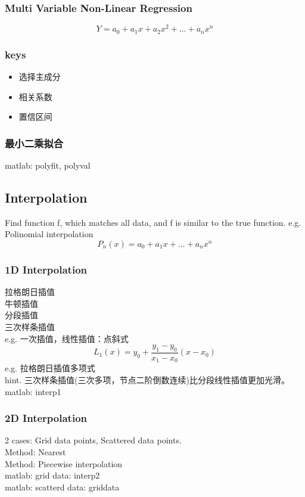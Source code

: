 \documentclass[12pt,a4paper]{article} \usepackage{kurier}
\begin{document}
\begin{CJK}{UTF8}{gkai}
\begin{multicols}{2}
		\subsubsection{Multi Variable Non-Linear Regression}
			\[ Y = a_0 + a_1 x + a_2 x^2 + \ldots + a_n x^n \]
		\subsubsection{keys}
			\begin{itemize}
			\item 选择主成分
			\item 相关系数
			\item 置信区间
			\end{itemize}
		\subsubsection{最小二乘拟合}
			matlab: polyfit, polyval\\
	\subsection{Interpolation}
		Find function f, which matches all data, and f is similar to the true function.
		e.g. Polinomial interpolation
		\[ P_n (x) = a_0 + a_1 x + \ldots + a_n x^n \]
		\subsubsection{1D Interpolation}
			拉格朗日插值\\ 牛顿插值\\ 分段插值\\ 三次样条插值\\
			e.g. 一次插值，线性插值：点斜式
			\[ L_1(x) = y_0 + \frac{y_1 - y_0}{x_1 - x_0} (x - x_0) \]
			e.g. 拉格朗日插值多项式\\
			hint. 三次样条插值(三次多项，节点二阶倒数连续)比分段线性插值更加光滑。\\
			matlab: interp1 \\
		\subsubsection{2D Interpolation}
			2 cases: Grid data points, Scattered data points.\\
			Method: Nearest\\
			Method: Piecewise interpolation\\
			matlab: grid data: interp2\\
			matlab: scatterd data: griddata\\

\end{multicols}
\end{CJK}
\end{document}
